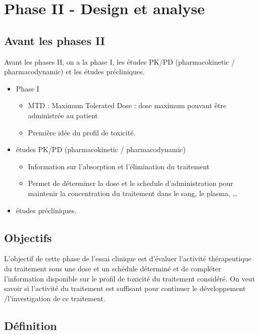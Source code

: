 \chapter{Phase II - Design et analyse}


\section{Avant les phases II}

Avant les phases II, on a la phase I, les études PK/PD (pharmacokinetic / pharmacodynamic) et les  études précliniques.

\begin{itemize}
    \item Phase I
    \begin{itemize}
    \item MTD : Maximum Tolerated Dose : dose maximum pouvant
être administrée au patient
    \item Première idée du profil de toxicité.
\end{itemize}
\item études PK/PD (pharmacokinetic / pharmacodynamic)
\begin{itemize}
    \item Information sur l’absorption et l’élimination du traitement
     \item Permet de déterminer la dose et le schedule
d’administration pour maintenir la concentration du
traitement dans le sang, le plasma, …
\end{itemize}
\item études précliniques.
\end{itemize}



\section{Objectifs}

L'objectif de cette phase de l'essai clinique est d'évaluer l’activité thérapeutique du traitement sous une dose et un schédule déterminé et de compléter l’information disponible sur le profil de toxicité du traitement considéré. On veut savoir si l’activité du traitement est suffisant pour continuer le développement /l’investigation de ce traitement.

\section{Définition}

